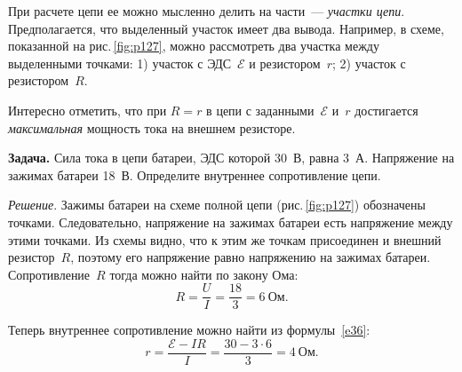 \documentclass[main.tex]{subfiles}
\begin{document}
\begin{NoHyper}
При расчете цепи ее можно мысленно делить на части~--- \emph{участки цепи}. Предполагается, что выделенный участок имеет два вывода. Например, в схеме, показанной на рис.\,\ref{fig:p127}, можно рассмотреть два участка между выделенными точками: 1) участок с ЭДС~$\mathscr E$ и резистором~$r$; 2) участок с резистором~$R$. 



Интересно отметить, что при $R=r$ в цепи с заданными~$\mathscr E$ и~$r$ достигается \emph{максимальная} мощность тока на внешнем резисторе.

\medskip

\noindent\textbf{Задача.} Сила тока в цепи батареи, ЭДС которой 30~В, равна 3~А. Напряжение на зажимах батареи 18~В. Определите внутреннее сопротивление цепи.

\smallskip

\noindent\emph{Решение}. Зажимы батареи на схеме полной цепи (рис.\,\ref{fig:p127}) обозначены точками. Следовательно, напряжение на зажимах батареи есть напряжение между этими точками. Из схемы видно, что к этим же точкам присоединен и внешний резистор~$R$, поэтому его напряжение равно напряжению на зажимах батареи. Сопротивление~$R$ тогда можно найти по закону Ома: 
\begin{equation*}
    R=\frac{U}{I}=\frac{18}{3}=6~\text{Ом.}
\end{equation*}

Теперь внутреннее сопротивление можно найти из формулы~\eqref{e36}:
\begin{equation*}
    r=\frac{\mathscr E-IR}{I}=\frac{30-3\cdot6}{3}=4~\text{Ом}.
\end{equation*}









\end{NoHyper}
\end{document}
